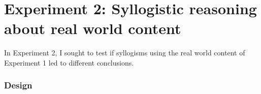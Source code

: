 \documentclass{llncs} %
\newcommand{\denote}[1]{\mbox{ $[\![ #1 ]\!]$}}
\begin{document}




\section{Experiment 2: Syllogistic reasoning about real world content}

In Experiment 2,  I sought to test if syllogisms using the real world content of Experiment 1 led to different conclusions.

\subsubsection{Design}
\end{document}
